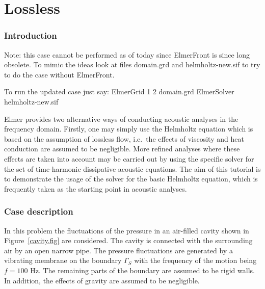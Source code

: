 \chapter{Lossless }



\subsection*{Introduction}

Note: this case cannot be performed as of today since ElmerFront is
since long obsolete. To mimic the ideas look at files domain.grd and
helmholtz-new.sif to try to do the case without ElmerFront.

To run the updated case just say:
\ttbegin
ElmerGrid 1 2 domain.grd
ElmerSolver helmholtz-new.sif
\ttend

Elmer provides two alternative ways of conducting acoustic analyses in the
frequency domain. Firstly, one may simply use the Helmholtz equation which 
is based on the assumption of lossless flow, i.e.\ the effects of viscosity 
and heat conduction are assumed to be negligible. More refined analyses where 
these effects are taken into account may be carried out by using the specific 
solver for the set of time-harmonic dissipative acoustic equations. 
The aim of this tutorial is to demonstrate the usage of the solver
for the basic Helmholtz equation, which is frequently taken as the starting
point in acoustic analyses. 

\subsection*{Case description}

In this problem the fluctuations of the pressure in an air-filled
cavity shown in Figure~\ref{cavity.fig} are considered. The cavity is 
connected with the surrounding air by an open narrow pipe. The pressure 
fluctuations are generated by a vibrating membrane on the boundary $\Gamma_S$ 
with the frequency of the motion being $f=100$ Hz. 
The remaining parts of the boundary are assumed to be rigid walls. 
In addition, the effects of gravity are assumed to be negligible.


